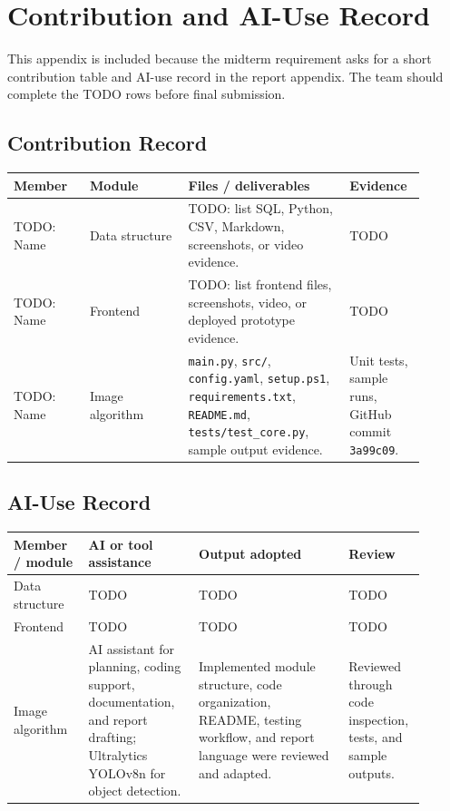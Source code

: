 \section{Contribution and AI-Use Record}

This appendix is included because the midterm requirement asks for a short contribution table and AI-use record in the report appendix. The team should complete the TODO rows before final submission.

\subsection{Contribution Record}

\begin{longtable}{|p{0.17\linewidth}|p{0.22\linewidth}|p{0.36\linewidth}|p{0.15\linewidth}|}
\hline
\textbf{Member} & \textbf{Module} & \textbf{Files / deliverables} & \textbf{Evidence} \\
\hline
TODO: Name & Data structure & TODO: list SQL, Python, CSV, Markdown, screenshots, or video evidence. & TODO \\
\hline
TODO: Name & Frontend & TODO: list frontend files, screenshots, video, or deployed prototype evidence. & TODO \\
\hline
TODO: Name & Image algorithm & \texttt{main.py}, \texttt{src/}, \texttt{config.yaml}, \texttt{setup.ps1}, \texttt{requirements.txt}, \texttt{README.md}, \texttt{tests/test\_core.py}, sample output evidence. & Unit tests, sample runs, GitHub commit \texttt{3a99c09}. \\
\hline
\end{longtable}

\subsection{AI-Use Record}

\begin{longtable}{|p{0.17\linewidth}|p{0.25\linewidth}|p{0.34\linewidth}|p{0.14\linewidth}|}
\hline
\textbf{Member / module} & \textbf{AI or tool assistance} & \textbf{Output adopted} & \textbf{Review} \\
\hline
Data structure & TODO & TODO & TODO \\
\hline
Frontend & TODO & TODO & TODO \\
\hline
Image algorithm & AI assistant for planning, coding support, documentation, and report drafting; Ultralytics YOLOv8n for object detection. & Implemented module structure, code organization, README, testing workflow, and report language were reviewed and adapted. & Reviewed through code inspection, tests, and sample outputs. \\
\hline
\end{longtable}

